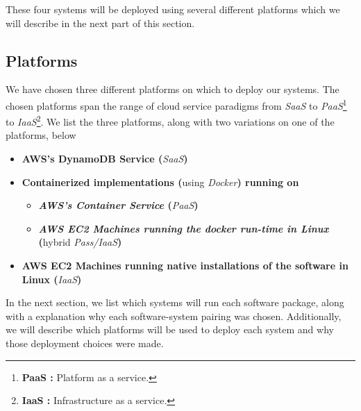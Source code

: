 \documentclass{article}[12pt]
\numberwithin{equation}{section}
\begin{document}
\begin{multicols*}{2}
\begin{spacing}{1.5}
These four systems will be deployed using several different platforms which we will describe in the next part of this section.
\end{spacing}




\subsection{Platforms}
\begin{spacing}{1.5}
We have chosen three different platforms on which to deploy our systems.  The chosen platforms span the range of cloud service paradigms from \emph{SaaS} to \emph{PaaS}\footnote{\textbf{PaaS :} Platform as a service.} to \emph{IaaS}\footnote{\textbf{IaaS :} Infrastructure as a service.}.  We list the three platforms, along with two variations on one of the platforms, below

\begin{itemize}
	\item \textbf{AWS's DynamoDB Service (}\emph{SaaS}\textbf{)}
	\item \textbf{Containerized implementations (}using \emph{Docker}\textbf{) running on}
	\begin{itemize}
		\item \textbf{\emph{AWS's Container Service} (}\emph{PaaS}\textbf{)}
		\item \textbf{\emph{AWS EC2 Machines running the docker run-time in Linux} (}hybrid \emph{Pass/IaaS}\textbf{)}
	\end{itemize}
	\item \textbf{AWS EC2 Machines running native installations of the software in Linux (}\emph{IaaS}\textbf{)}
\end{itemize}

In the next section, we list which systems will run each software package, along with a explanation why each software-system pairing was chosen.  Additionally, we will describe which platforms will be used to deploy each system and why those deployment choices were made.
\end{spacing}






\end{multicols*}
\end{document}
